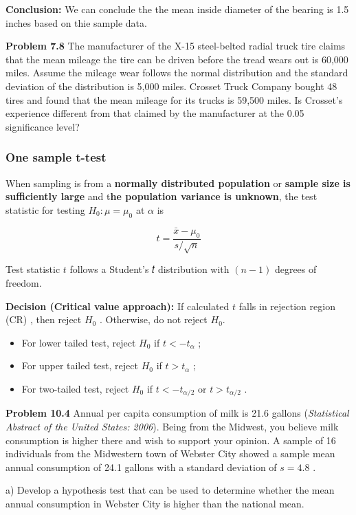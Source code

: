 \documentclass[
  11pt,
  letterpaper,
  DIV=11,
  numbers=noendperiod]{scrreprt}
\begin{document}
\textbf{Conclusion:} We can conclude the the mean inside diameter of the
bearing is 1.5 inches based on thie sample data.

\textbf{Problem 7.8} The manufacturer of the X-15 steel-belted radial
truck tire claims that the mean mileage the tire can be driven before
the tread wears out is 60,000 miles. Assume the mileage wear follows the
normal distribution and the standard deviation of the distribution is
5,000 miles. Crosset Truck Company bought 48 tires and found that the
mean mileage for its trucks is 59,500 miles. Is Crosset's experience
different from that claimed by the manufacturer at the 0.05 significance
level?

\subsubsection{One sample t-test}\label{one-sample-t-test}

When sampling is from a \textbf{normally distributed population} or
\textbf{sample size is sufficiently large} and t\textbf{he population
variance is unknown}, the test statistic for testing \(H_0: \mu=\mu_0\)
at \(\alpha\) is

\[t=\frac{\bar x-\mu_0}{s /\sqrt n}\]

Test statistic \(t\) follows a Student's 𝑡 distribution with \((n - 1)\)
degrees of freedom.

\textbf{Decision (Critical value approach):} If calculated \(t\) falls
in rejection region (CR) , then reject \(H_0\) . Otherwise, do not
reject \(H_0\).

\begin{itemize}
\item
  For lower tailed test, reject \(H_0\) if \(t<-t_\alpha\) ;
\item
  For upper tailed test, reject \(H_0\) if \(t> t_\alpha\) ;
\item
  For two-tailed test, reject \(H_0\) if \(t<-t_{\alpha/2}\) or
  \(t>t_{\alpha/2}\) .
\end{itemize}

\textbf{Problem 10.4} Annual per capita consumption of milk is 21.6
gallons (\emph{Statistical Abstract of the United States: 2006}). Being
from the Midwest, you believe milk consumption is higher there and wish
to support your opinion. A sample of 16 individuals from the Midwestern
town of Webster City showed a sample mean annual consumption of 24.1
gallons with a standard deviation of \(s=4.8\) .

a) Develop a hypothesis test that can be used to determine whether the
mean annual consumption in Webster City is higher than the national
mean.
\end{document}
